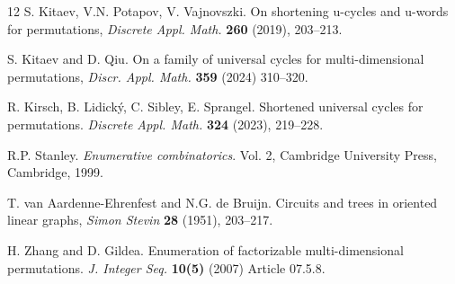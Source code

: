 \documentclass[12pt]{article}
\begin{document}
\begin{thebibliography}{12}
 S. Kitaev, V.N. Potapov, V. Vajnovszki. On shortening u-cycles and u-words for permutations, {\em Discrete Appl. Math.} {\bf 260} (2019), 203--213.

 S. Kitaev and D. Qiu. On a family of universal cycles for multi-dimensional permutations, {\em Discr. Appl. Math.} {\bf 359} (2024) 310--320. 

 R. Kirsch, B. Lidick\'{y}, C. Sibley, E. Sprangel. Shortened universal cycles for permutations.  {\em Discrete Appl. Math.} {\bf 324} (2023), 219--228.

 R.P. Stanley. {\em Enumerative combinatorics}. Vol. 2, Cambridge University Press, Cambridge, 1999.

 T. van Aardenne-Ehrenfest and N.G. de Bruijn. Circuits and trees in oriented linear graphs, {\em Simon Stevin} {\bf 28} (1951), 203--217.

 H. Zhang and D. Gildea. Enumeration of factorizable multi-dimensional permutations. {\em J. Integer Seq.} {\bf 10(5)} (2007) Article 07.5.8.

\end{thebibliography}
\end{document}
